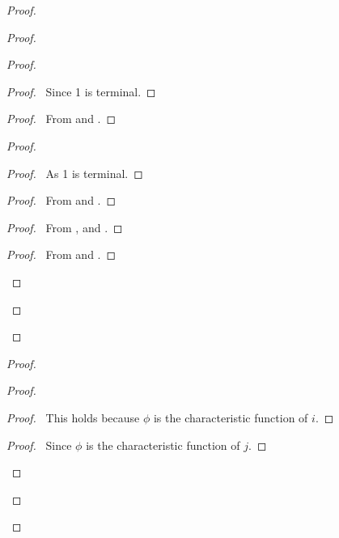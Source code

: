 \begin{proof}
\begin{proof}
\begin{proof}
\begin{proof}
  \pf\ Since 1 is terminal.
\end{proof}
\begin{proof}
  \pf\ From  and .
\end{proof}
\begin{proof}
  \begin{proof}
    \pf\ As 1 is terminal.
  \end{proof}
  \begin{proof}
    \pf\ From  and .
  \end{proof}
  \begin{proof}
    \pf\ From ,  and .
  \end{proof}
  \begin{proof}
    \pf\ From  and .
  \end{proof}
\end{proof}
\end{proof}
\end{proof}
\begin{proof}
  \begin{proof}
    \begin{proof}
      \pf\ This holds because $\phi$ is the characteristic function of $i$.
    \end{proof}
    \qedstep
    \begin{proof}
      \pf\ Since $\phi$ is the characteristic function of $j$.
    \end{proof}

\end{proof}
\end{proof}
\end{proof}
